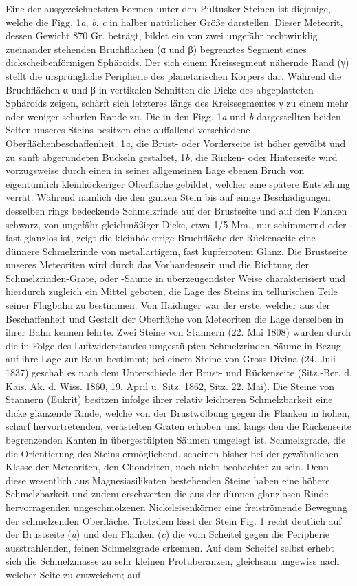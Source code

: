 \documentclass[a4paper, 11pt, oneside, german]{article}
\begin{document}
Eine der ausgezeichnetsten Formen unter den Pultusker Steinen ist diejenige, welche die Figg. 1\emph{a}, \emph{b}, \emph{c} in halber natürlicher Größe darstellen. Dieser Meteorit, dessen Gewicht 870 Gr. beträgt, bildet ein von zwei ungefähr rechtwinklig zueinander stehenden Bruchflächen (α und β) begrenztes Segment eines dickscheibenförmigen Sphäroids. Der sich einem Kreissegment nähernde Rand (γ) stellt die ursprüngliche Peripherie des planetarischen Körpers dar. Während die Bruchflächen α und β in vertikalen Schnitten die Dicke des abgeplatteten Sphäroids zeigen, schärft sich letzteres längs des Kreissegmentes γ zu einem mehr oder weniger scharfen Rande zu. Die in den Figg. 1\emph{a} und \emph{b} dargestellten beiden Seiten unseres Steins besitzen eine auffallend verschiedene Oberflächenbeschaffenheit. 1\emph{a}, die Brust- oder Vorderseite ist höher gewölbt und zu sanft abgerundeten Buckeln gestaltet, 1\emph{b}, die Rücken- oder Hinterseite wird vorzugsweise durch einen in seiner allgemeinen Lage ebenen Bruch von eigentümlich kleinhöckeriger Oberfläche gebildet, welcher eine spätere Entstehung verrät. Während nämlich die den ganzen Stein bis auf einige Beschädigungen desselben rings bedeckende Schmelzrinde auf der Brustseite und auf den Flanken schwarz, von ungefähr gleichmäßiger Dicke, etwa 1/5 Mm., nur schimmernd oder fast glanzlos ist, zeigt die kleinhöckerige Bruchfläche der Rückenseite eine dünnere Schmelzrinde von metallartigem, fast kupferrotem Glanz. Die Brustseite unseres Meteoriten wird durch das Vorhandensein und die Richtung der Schmelzrinden-Grate, oder -Säume in überzeugendster Weise charakterisiert und hierdurch zugleich ein Mittel geboten, die Lage des Steins im tellurischen Teile seiner Flugbahn zu bestimmen. Von Haidinger war der erste, welcher aus der Beschaffenheit und Gestalt der Oberfläche von Meteoriten die Lage derselben in ihrer Bahn kennen lehrte. Zwei Steine von Stannern (22. Mai 1808) wurden durch die in Folge des Luftwiderstandes umgestülpten Schmelzrinden-Säume in Bezug auf ihre Lage zur Bahn bestimmt; bei einem Steine von Gross-Divina (24. Juli 1837) geschah es nach dem Unterschiede der Brust- und Rückenseite (Sitz.-Ber. d. Kais. Ak. d. Wiss. 1860, 19. April u. Sitz. 1862, Sitz. 22. Mai). Die Steine von Stannern (Eukrit) besitzen infolge ihrer relativ leichteren Schmelzbarkeit eine dicke glänzende Rinde, welche von der Brustwölbung gegen die Flanken in hohen, scharf hervortretenden, verästelten Graten erhoben und längs den die Rückenseite begrenzenden Kanten in übergestülpten Säumen umgelegt ist. Schmelzgrade, die die Orientierung des Steins ermöglichend, scheinen bisher bei der gewöhnlichen Klasse der Meteoriten, den Chondriten, noch nicht beobachtet zu sein. Denn diese wesentlich aus Magnesiasilikaten bestehenden Steine haben eine höhere Schmelzbarkeit und zudem erschwerten die aus der dünnen glanzlosen Rinde hervorragenden ungeschmolzenen Nickeleisenkörner eine freiströmende Bewegung der schmelzenden Oberfläche. Trotzdem lässt der Stein Fig. 1 recht deutlich auf der Brustseite (\emph{a}) und den Flanken (\emph{c}) die vom Scheitel gegen die Peripherie ausstrahlenden, feinen Schmelzgrade erkennen. Auf dem Scheitel selbst erhebt sich die Schmelzmasse zu sehr kleinen Protuberanzen, gleichsam ungewiss nach welcher Seite zu entweichen; auf 
\end{document}
